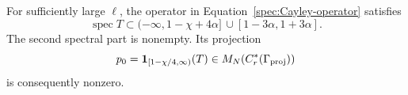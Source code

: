 \begin{proposition}
\label{spec:global-gap}
For sufficiently large $\ell$, the operator in
Equation~\eqref{spec:Cayley-operator} satisfies
\begin{equation}
 \operatorname{spec}T
 \subset(-\infty,1-\chi+4\alpha]\,
             \cup[1-3\alpha,1+3\alpha].
 \label{spec:global-spectrum}
\end{equation}
The second spectral part is nonempty.  Its projection
\begin{equation}
          p_0=\mathbf1_{[1-\chi/4,\infty)}(T)
                    \in M_N(C_r^*(\Gamma_{\mathrm{proj}}))
 \label{spec:p0}
\end{equation}
is consequently nonzero.
\end{proposition}

